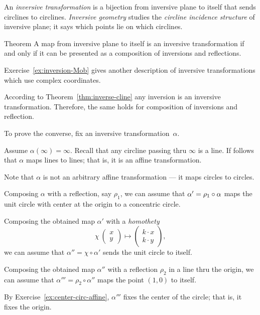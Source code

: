 An \emph{inversive transformation} is a bijection from inversive plane to itself that sends circlines to circlines.
\emph{Inversive geometry} studies the {}\emph{circline incidence structure} of inversive plane;
it says which points lie on which circlines.

\begin{thm}{Theorem}\label{thm:inversions-inversive}
A map from inversive plane to itself is an inversive transformation
if and only if it can be presented as a composition of inversions and reflections.  
\end{thm}

Exercise~\ref{ex:inversion-Mob} gives another description of inversive transformations which use complex coordinates.

According to Theorem~\ref{thm:inverse-cline} any inversion is an inversive transformation.
Therefore, the same holds for composition of inversions and reflection.

To prove the converse, 
fix an inversive transformation~$\alpha$.

Assume $\alpha(\infty)=\infty$.
Recall that any circline passing thru $\infty$ is a line.
If follows that $\alpha$ maps lines to lines;
that is,
it is an affine transformation.

Note that $\alpha$ is not an arbitrary affine transformation --- it maps circles to circles.

Composing $\alpha$ with a reflection, say $\rho_1$, we can assume that $\alpha'\z=\rho_1\circ\alpha$ maps the unit circle with center at the origin to a concentric circle. 

Composing the obtained map $\alpha'$ with a {}\emph{homothety} 
\[\chi\:\left(\begin{smallmatrix}
x\\ y
\end{smallmatrix} \right)\mapsto \left(\begin{smallmatrix}
k\cdot x\\ k\cdot y
\end{smallmatrix} \right),\]
we can assume that $\alpha''=\chi\circ\alpha'$ sends the unit circle to itself.


Composing the obtained map $\alpha''$ with a reflection $\rho_2$ in a line thru the origin,
we can assume that $\alpha'''=\rho_2\circ\alpha''$ maps the point $(1,0)$ to itself.

By Exercise~\ref{ex:center-circ-affine},
$\alpha'''$ fixes the center of the circle;
that is, it fixes the origin.

